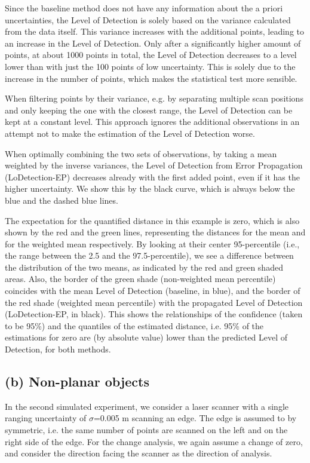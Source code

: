 \documentclass[preprint,12pt,3p]{elsarticle}
\begin{document}
Since the baseline method does not have any information about the a priori uncertainties, the Level of Detection is solely based on the variance calculated from the data itself. This variance increases with the additional points, leading to an increase in the Level of Detection. Only after a significantly higher amount of points, at about 1000 points in total, the Level of Detection decreases to a level lower than with just the 100 points of low uncertainty. This is solely due to the increase in the number of points, which makes the statistical test more sensible.

When filtering points by their variance, e.g. by separating multiple scan positions and only keeping the one with the closest range, the Level of Detection can be kept at a constant level. This approach ignores the additional observations in an attempt not to make the estimation of the Level of Detection worse.

When optimally combining the two sets of observations, by taking a mean weighted by the inverse variances, the Level of Detection from Error Propagation (LoDetection-EP) decreases already with the first added point, even if it has the higher uncertainty. We show this by the black curve, which is always below the blue and the dashed blue lines.

The expectation for the quantified distance in this example is zero, which is also shown by the red and the green lines, representing the distances for the mean and for the weighted mean respectively. By looking at their center 95-percentile (i.e., the range between the 2.5 and the 97.5-percentile), we see a difference between the distribution of the two means, as indicated by the red and green shaded areas. Also, the border of the green shade (non-weighted mean percentile) coincides with the mean Level of Detection (baseline, in blue), and the border of the red shade (weighted mean percentile) with the propagated Level of Detection (LoDetection-EP, in black). This shows the relationships of the confidence (taken to be 95\%) and the quantiles of the estimated distance, i.e. 95\% of the estimations for zero are (by absolute value) lower than the predicted Level of Detection, for both methods.

\subsection{(b) Non-planar objects}
In the second simulated experiment, we consider a laser scanner with a single ranging uncertainty of $\sigma$=0.005 m scanning an edge. The edge is assumed to by symmetric, i.e. the same number of points are scanned on the left and on the right side of the edge. For the change analysis, we again assume a change of zero, and consider the direction facing the scanner as the direction of analysis.
\end{document}
